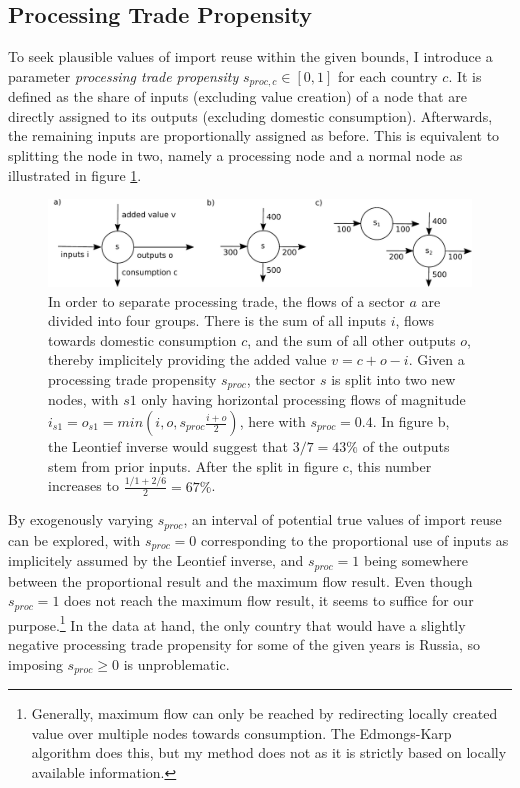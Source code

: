 \documentclass[english]{uzhpub}
\begin{document}
\subsection{Processing Trade Propensity}
To seek plausible values of import reuse within the given bounds, I introduce a parameter \emph{processing trade propensity} $s_{proc,c} \in [0,1]$ for each country $c$. It is defined as the share of inputs (excluding value creation) of a node that are directly assigned to its outputs (excluding domestic consumption). Afterwards, the remaining inputs are proportionally assigned as before. This is equivalent to splitting the node in two, namely a processing node and a normal node as illustrated in figure \ref{fig:sketch}.

\begin{figure}
\centering
\includegraphics[scale=0.8]{../results/sketch}
\caption{In order to separate processing trade, the flows of a sector $a$ are divided into four groups. There is the sum of all inputs $i$, flows towards domestic consumption $c$, and the sum of all other outputs $o$, thereby implicitely providing the added value $v = c + o - i$. Given a processing trade propensity $s_{proc}$, the sector $s$ is split into two new nodes, with $s1$ only having horizontal processing flows of magnitude $i_{s1}=o_{s1}=min(i, o, s_{proc} \frac{i+o}{2})$, here with $s_{proc}=0.4$. In figure b, the Leontief inverse would suggest that $3/7=43\%$ of the outputs stem from prior inputs. After the split in figure c, this number increases to $\frac{1/1 + 2/6}{2}=67\%$.}\label{fig:sketch}
\end{figure}

By exogenously varying $s_{proc}$, an interval of potential true values of import reuse can be explored, with $s_{proc}=0$ corresponding to the proportional use of inputs as implicitely assumed by the Leontief inverse, and $s_{proc}=1$ being somewhere between the proportional result and the maximum flow result. Even though $s_{proc}=1$ does not reach the maximum flow result, it seems to suffice for our purpose.\footnote{Generally, maximum flow can only be reached by redirecting locally created value over multiple nodes towards consumption. The Edmongs-Karp algorithm does this, but my method does not as it is strictly based on locally available information.} In the data at hand, the only country that would have a slightly negative processing trade propensity for some of the given years is Russia, so imposing $s_{proc}\geq0$ is unproblematic.
\end{document}

